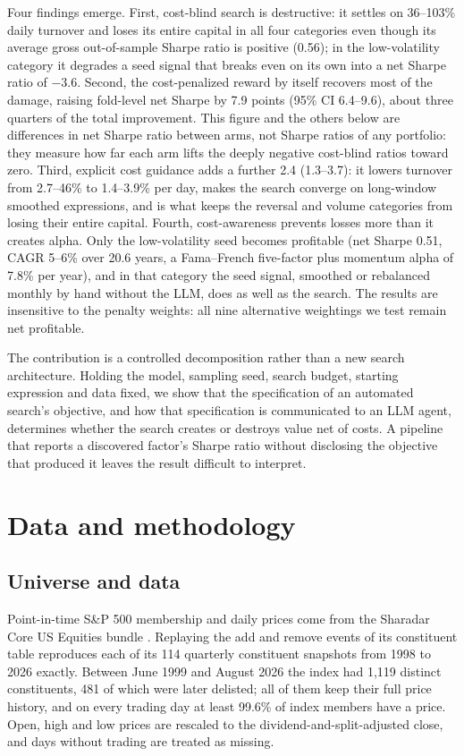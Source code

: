 \documentclass[preprint,12pt,authoryear]{elsarticle}
\begin{document}
Four findings emerge. First, cost-blind search is destructive: it settles on 36--103\% daily turnover and loses its entire capital in all four categories even though its average gross out-of-sample Sharpe ratio is positive (0.56); in the low-volatility category it degrades a seed signal that breaks even on its own into a net Sharpe ratio of $-3.6$. Second, the cost-penalized reward by itself recovers most of the damage, raising fold-level net Sharpe by 7.9 points (95\% CI 6.4--9.6), about three quarters of the total improvement. This figure and the others below are differences in net Sharpe ratio between arms, not Sharpe ratios of any portfolio: they measure how far each arm lifts the deeply negative cost-blind ratios toward zero. Third, explicit cost guidance adds a further 2.4 (1.3--3.7): it lowers turnover from 2.7--46\% to 1.4--3.9\% per day, makes the search converge on long-window smoothed expressions, and is what keeps the reversal and volume categories from losing their entire capital. Fourth, cost-awareness prevents losses more than it creates alpha. Only the low-volatility seed becomes profitable (net Sharpe 0.51, CAGR 5--6\% over 20.6 years, a Fama--French five-factor plus momentum alpha of 7.8\% per year), and in that category the seed signal, smoothed or rebalanced monthly by hand without the LLM, does as well as the search. The results are insensitive to the penalty weights: all nine alternative weightings we test remain net profitable.

The contribution is a controlled decomposition rather than a new search architecture. Holding the model, sampling seed, search budget, starting expression and data fixed, we show that the specification of an automated search's objective, and how that specification is communicated to an LLM agent, determines whether the search creates or destroys value net of costs. A pipeline that reports a discovered factor's Sharpe ratio without disclosing the objective that produced it leaves the result difficult to interpret.

\section{Data and methodology}\label{sec:method}

\subsection{Universe and data}\label{sec:data}

Point-in-time S\&P 500 membership and daily prices come from the Sharadar Core US Equities bundle \citep{sharadar2026}. Replaying the add and remove events of its constituent table reproduces each of its 114 quarterly constituent snapshots from 1998 to 2026 exactly. Between June 1999 and August 2026 the index had 1,119 distinct constituents, 481 of which were later delisted; all of them keep their full price history, and on every trading day at least 99.6\% of index members have a price. Open, high and low prices are rescaled to the dividend-and-split-adjusted close, and days without trading are treated as missing.
\end{document}
